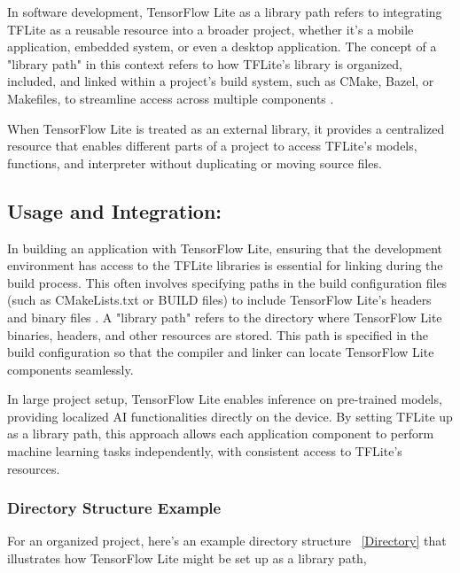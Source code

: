 In software development, TensorFlow Lite as a library path refers to integrating TFLite as a reusable resource into a broader project, whether it's a mobile application, embedded system, or even a desktop application. The concept of a "library path" in this context refers to how TFLite’s library is organized, included, and linked within a project's build system, such as CMake, Bazel, or Makefiles, to streamline access across multiple components \cite{TensorFlowLiteMicro:2024}.

When TensorFlow Lite is treated as an external library, it provides a centralized resource that enables different parts of a project to access TFLite's models, functions, and interpreter without duplicating or moving source files. 

\subsection{Usage and Integration:}

In building an application with TensorFlow Lite, ensuring that the development environment has access to the TFLite libraries is essential for linking during the build process. This often involves specifying paths in the build configuration files (such as CMakeLists.txt or BUILD files) to include TensorFlow Lite's headers and binary files \cite{TensorFlowLiteArm:2024}. A "library path" refers to the directory where TensorFlow Lite binaries, headers, and other resources are stored. This path is specified in the build configuration so that the compiler and linker can locate TensorFlow Lite components seamlessly.

In large project setup, TensorFlow Lite enables inference on pre-trained models, providing localized AI functionalities directly on the device. By setting TFLite up as a library path, this approach allows each application component to perform machine learning tasks independently, with consistent access to TFLite’s resources.

\subsubsection{Directory Structure Example}
For an organized project, here’s an example directory structure ~\ref{Directory} that illustrates how TensorFlow Lite might be set up as a library path,

